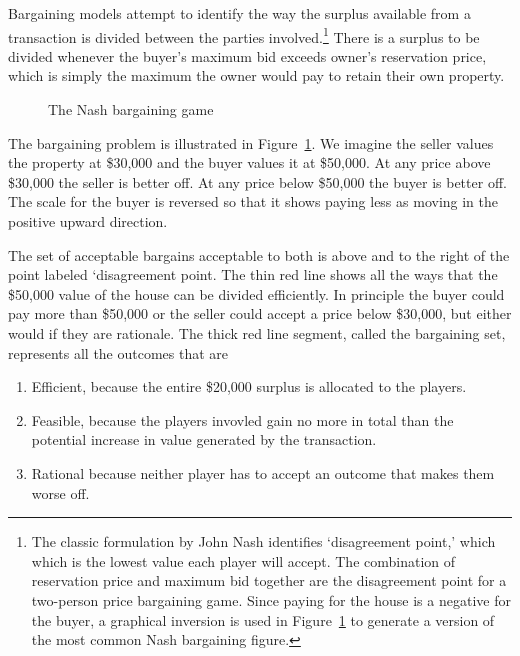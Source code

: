 {Bargaining models attempt to identify the way the surplus available from a transaction is divided between the parties involved.\footnote{The classic  formulation by John Nash %
identifies  `\gls{disagreement point},' which which is the  lowest value each player will accept. The combination of reservation price and maximum bid together are the disagreement point for a two-person price bargaining game. Since paying for the house is a negative for the buyer, a graphical inversion is used  in Figure~\ref{fig:Nash-bargaining-game} to generate a version of the most common Nash bargaining figure.} 
There is a surplus to be divided whenever the buyer's maximum bid exceeds owner's \gls{reservation price}, which is simply the maximum the owner would pay to retain their own property. 
    \begin{figure}
        \centering
        
        \caption{The Nash bargaining game}
        \label{fig:Nash-bargaining-game}
    \end{figure}


The bargaining problem is illustrated in Figure~\ref{fig:Nash-bargaining-game}. We imagine the seller values the property at \$30,000 and the buyer values it at \$50,000.  At any price above \$30,000 the seller is better off. At any price below \$50,000 the buyer is better off. The scale for the buyer is reversed so that it shows  paying less as moving in the positive upward direction. 

The set of acceptable bargains acceptable to both is above and to the right of the point labeled `disagreement point. 
The thin red line shows all the ways that the \$50,000 value of the house can be divided efficiently. In principle the buyer could pay more than \$50,000 or the seller could accept a price below \$30,000, but either would if they are rationale. 
The thick red line segment, called the bargaining set, represents all the outcomes that are\begin{enumerate}
    \item Efficient, because the entire \$20,000 surplus is allocated to the players. 
    \item Feasible, because the players invovled gain no more in total than the potential increase in value generated by the transaction.
    \item Rational because neither player has to accept an outcome that makes them worse off.
\end{enumerate}   

}
